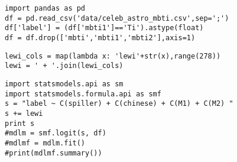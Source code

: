 \documentclass[12pt,fleqn]{article}\usepackage{../common}
\begin{document}
\begin{verbatim}
import pandas as pd
df = pd.read_csv('data/celeb_astro_mbti.csv',sep=';')
df['label'] = (df['mbti1']=='Ti').astype(float)
df = df.drop(['mbti','mbti1','mbti2'],axis=1)
\end{verbatim}

\begin{verbatim}
lewi_cols = map(lambda x: 'lewi'+str(x),range(278))
lewi = ' + '.join(lewi_cols)
\end{verbatim}

\begin{verbatim}
import statsmodels.api as sm
import statsmodels.formula.api as smf
s = "label ~ C(spiller) + C(chinese) + C(M1) + C(M2) "
s += lewi
print s
#mdlm = smf.logit(s, df)
#mdlmf = mdlm.fit()
#print(mdlmf.summary())
\end{verbatim}
\end{document}
